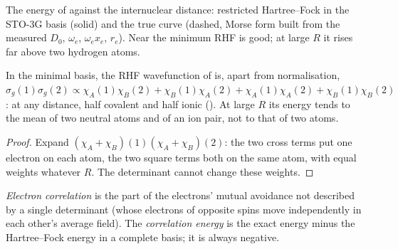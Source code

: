 \begin{omfigure}

{\small The energy of  against the internuclear distance: restricted
Hartree--Fock in the STO-3G basis (solid) and the true curve (dashed, Morse
form built from the measured $D_0$, $\omega_e$, $\omega_ex_e$, $r_e$). Near the
minimum RHF is good; at large $R$ it rises far above two hydrogen atoms.}
\end{omfigure}

\begin{proposition}\label{prop:b3:computational-chemistry:rhf-dissociation}
In the minimal basis, the RHF wavefunction of  is, apart from
normalisation, $\sigma_g(1)\sigma_g(2) \propto \chi_A(1)\chi_B(2) + \chi_B(1)\chi_A(2)
+ \chi_A(1)\chi_A(2) + \chi_B(1)\chi_B(2)$: at any distance, half covalent and half
ionic (). At large $R$ its energy tends to the mean of two
neutral atoms and of an ion pair, not to that of two atoms.
\end{proposition}

\begin{proof}
Expand $(\chi_A + \chi_B)(1)(\chi_A + \chi_B)(2)$: the two cross terms put one
electron on each atom, the two square terms both on the same atom, with
equal weights whatever $R$. The determinant cannot change these weights.
\end{proof}

\begin{definition}\label{def:b3:computational-chemistry:correlation}
\emph{Electron correlation} is the part of the
electrons' mutual avoidance not described by a single determinant (whose
electrons of opposite spins move independently in each other's average
field). The \emph{correlation energy} is the exact
energy minus the Hartree--Fock energy in a complete basis; it is always
negative.
\end{definition}

